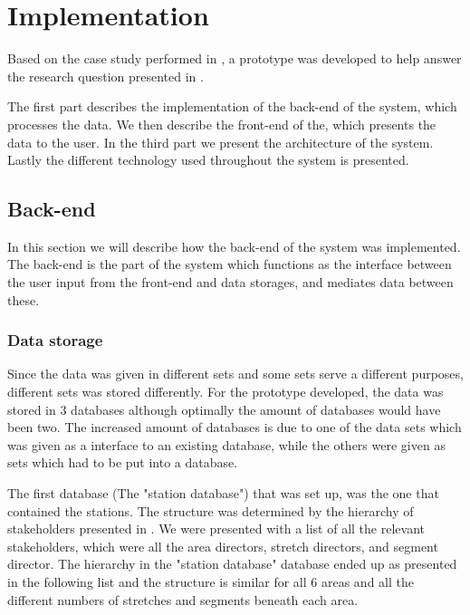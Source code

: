 
\chapter{Implementation} %
\label{cha:implementation}
Based on the case study performed in  , a
prototype was developed to help answer the research question presented in
 .

The first part describes the implementation of the back-end of the system, 
which processes the data. We then describe the front-end of the, which
presents the data to the user. In the third part we present the architecture of
the system. Lastly the different technology used throughout the system is
presented.

\section{Back-end} %
\label{sec:back_end}
In this section we will describe how the back-end of the system was 
implemented. The back-end is the part of the system which functions as the
interface between the user input from the front-end and data storages, and
mediates data between these.

\subsection{Data storage} %
\label{sub:back_end_data_storage}
Since the data was given in different sets and some sets serve a different
purposes, different sets was stored differently. For the prototype developed, 
the data was stored in 3 databases although optimally the amount of databases 
would have been two. The increased amount of databases is due to one of the data sets which was given as a interface to an existing database, while the others were given as sets which had to be put into a database.

The first database (The "station database") that was set up, was the one that 
contained the stations.
The structure was determined by the hierarchy of stakeholders presented in
.  We were presented with a list of all the
relevant stakeholders, which were all the area directors, stretch directors,
and segment director. The hierarchy in the "station database" database ended 
up as presented in the following list and the structure is similar for all 6 
areas and all the different numbers of stretches and segments beneath each 
area.

